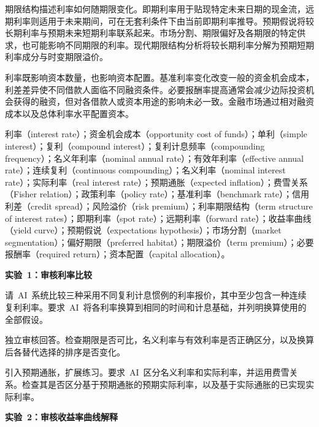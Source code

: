 期限结构描述利率如何随期限变化。即期利率用于贴现特定未来日期的现金流，远期利率则适用于未来期间，可在无套利条件下由当前即期利率推导。预期假说将较长期利率与预期未来短期利率联系起来。市场分割、期限偏好及各期限的特定供求，也可能影响不同期限的利率。现代期限结构分析将较长期利率分解为预期短期利率成分与时变期限溢价。

利率既影响资本数量，也影响资本配置。基准利率变化改变一般的资金机会成本，利差差异使不同借款人面临不同融资条件。必要报酬率提高通常会减少边际投资机会获得的融资，但对各借款人或资本用途的影响未必一致。金融市场通过相对融资成本以及总体利率水平配置资本。



利率（interest rate）；资金机会成本（opportunity cost of funds）；单利（simple interest）；复利（compound interest）；复利计息频率（compounding frequency）；名义年利率（nominal annual rate）；有效年利率（effective annual rate）；连续复利（continuous compounding）；名义利率（nominal interest rate）；实际利率（real interest rate）；预期通胀（expected inflation）；费雪关系（Fisher relation）；政策利率（policy rate）；基准利率（benchmark rate）；信用利差（credit spread）；风险溢价（risk premium）；利率期限结构（term structure of interest rates）；即期利率（spot rate）；远期利率（forward rate）；收益率曲线（yield curve）；预期假说（expectations hypothesis）；市场分割（market segmentation）；偏好期限（preferred habitat）；期限溢价（term premium）；必要报酬率（required return）；资本配置（capital allocation）。



\textbf{实验~1：审核利率比较}

请~AI~系统比较三种采用不同复利计息惯例的利率报价，其中至少包含一种连续复利利率。要求~AI~将各利率换算到相同的时间和计息基础，并列明换算使用的全部假设。

独立审核回答。检查期限是否可比，名义利率与有效利率是否正确区分，以及换算后各替代选择的排序是否变化。

引入预期通胀，扩展练习。要求~AI~区分名义利率和实际利率，并运用费雪关系。检查其是否区分基于预期通胀的预期实际利率，以及基于实际通胀的已实现实际利率。

\textbf{实验~2：审核收益率曲线解释}

